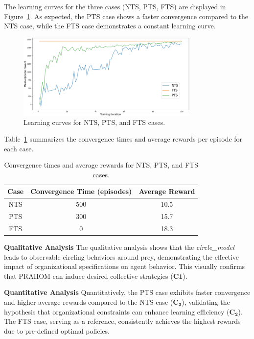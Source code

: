 \documentclass[runningheads]{llncs}
\theoremstyle{freethm}
\theoremstyle{proofoutline}
\begin{document}
The learning curves for the three cases (NTS, PTS, FTS) are displayed in Figure~\ref{fig:learning_curves}. As expected, the PTS case shows a faster convergence compared to the NTS case, while the FTS case demonstrates a constant learning curve.

\begin{figure}[h!]
    \centering
    \includegraphics[width=0.8\textwidth]{figures/prahom_learning_curve.png}
    \caption{Learning curves for NTS, PTS, and FTS cases.}
    \label{fig:learning_curves}
\end{figure}

Table~\ref{tab:results} summarizes the convergence times and average rewards per episode for each case.

\begin{table}[h!]
    \centering
    \begin{tabular}{|c|c|c|}
        \hline
        Case & Convergence Time (episodes) & Average Reward \\
        \hline
        NTS  & 500                         & 10.5           \\
        PTS  & 300                         & 15.7           \\
        FTS  & 0                           & 18.3           \\
        \hline
    \end{tabular}
    \caption{Convergence times and average rewards for NTS, PTS, and FTS cases.}
    \label{tab:results}
\end{table}

\textbf{Qualitative Analysis} \quad The qualitative analysis shows that the \textit{circle\_model} leads to observable circling behaviors around prey, demonstrating the effective impact of organizational specifications on agent behavior. This visually confirms that PRAHOM can induce desired collective strategies ($\mathbf{C1}$).

\textbf{Quantitative Analysis} \quad Quantitatively, the PTS case exhibits faster convergence and higher average rewards compared to the NTS case ($\mathbf{C_3}$), validating the hypothesis that organizational constraints can enhance learning efficiency ($\mathbf{C_2}$). The FTS case, serving as a reference, consistently achieves the highest rewards due to pre-defined optimal policies.
\end{document}
